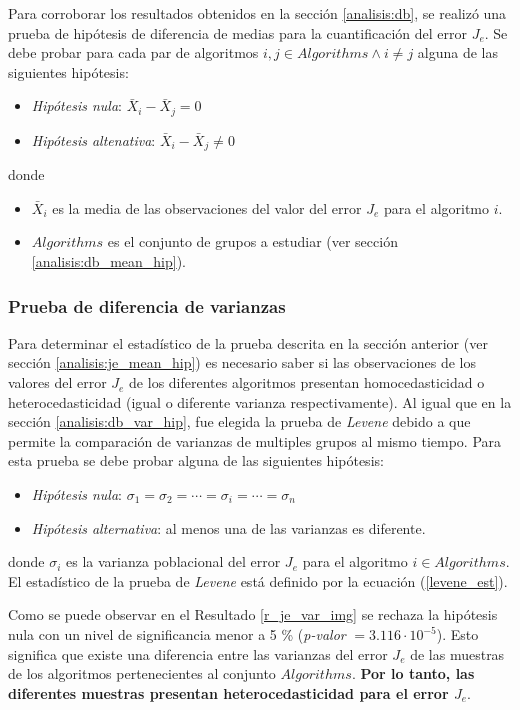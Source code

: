     Para corroborar los resultados obtenidos en la sección \ref{analisis:db}, se
realizó una prueba de hipótesis de diferencia de medias para la cuantificación
del error $J_e$. Se debe probar para cada par de algoritmos $i, j \in Algorithms
\land i \neq j$ alguna de las siguientes hipótesis:
\begin{itemize}
    \item \emph{Hipótesis nula}: $\bar{X}_i - \bar{X}_j = 0$
    \item \emph{Hipótesis altenativa}: $\bar{X}_i - \bar{X}_j \neq 0$
\end{itemize}
\newpage
donde
\begin{itemize}
    \item $\bar{X}_i$ es la media de las observaciones del valor del error $J_e$
          para el algoritmo $i$.
    \item $Algorithms$ es el conjunto de grupos a estudiar (ver sección
          \ref{analisis:db_mean_hip}).
\end{itemize}

\subsubsection{Prueba de diferencia de varianzas}\label{analisis:je_var_hip}

    Para determinar el estadístico de la prueba descrita en la sección
anterior (ver sección \ref{analisis:je_mean_hip}) es necesario saber si las
observaciones de los valores del error $J_e$ de los di\-fe\-ren\-tes algoritmos
presentan homocedasticidad o heterocedasticidad (igual o diferente varianza
respectivamente). Al igual que en la sección \ref{analisis:db_var_hip}, fue
elegida la prueba de \emph{Levene} \cite{Levene_Test} debido a que permite la
comparación de varianzas de multiples grupos al mismo tiempo. Para esta prueba
se debe probar alguna de las siguientes hipótesis:
\begin{itemize}
    \item \emph{Hipótesis nula}: $\sigma_1 = \sigma_2 = \cdots = \sigma_i = \cdots = \sigma_n$
    \item \emph{Hipótesis alternativa}: al menos una de las varianzas es diferente.
\end{itemize}
donde $\sigma_i$ es la varianza poblacional del error $J_e$ para el algoritmo
$i \in Algorithms$. El estadístico de la prueba de \emph{Levene} está definido
por la ecuación (\ref{levene_est}).

    Como se puede observar en el Resultado \ref{r_je_var_img} se rechaza la hipótesis
nula con un nivel de significancia menor a 5 \% (\emph{p-valor} $ = 3.116 \cdot 10^{-5}$).
Esto significa que existe una diferencia entre las varianzas del error $J_e$
de las muestras de los algoritmos pertenecientes al conjunto $Algorithms$.
\textbf{Por lo tanto, las diferentes muestras presentan heterocedasticidad para
el error $J_e$}.

